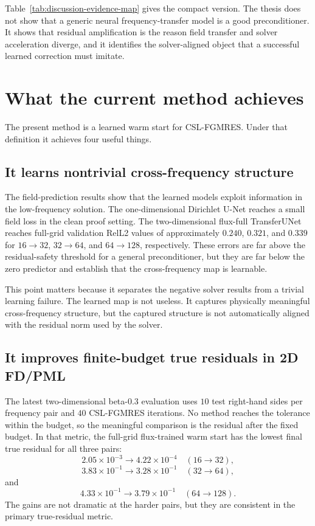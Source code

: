 Table~\ref{tab:discussion-evidence-map} gives the compact version. The thesis
does not show that a generic neural frequency-transfer model is a good
preconditioner. It shows that residual amplification is the reason field
transfer and solver acceleration diverge, and it identifies the solver-aligned
object that a successful learned correction must imitate.

\section{What the current method achieves}
\label{sec:discussion-what-works}

The present method is a learned warm start for CSL-FGMRES. Under that
definition it achieves four useful things.

\subsection{It learns nontrivial cross-frequency structure}
\label{subsec:discussion-cross-frequency}

The field-prediction results show that the learned models exploit information
in the low-frequency solution. The one-dimensional Dirichlet U-Net reaches a
small field loss in the clean proof setting. The two-dimensional flux-full
TransferUNet reaches full-grid validation RelL2 values of approximately
$0.240$, $0.321$, and $0.339$ for $16\to32$, $32\to64$, and $64\to128$,
respectively. These errors are far above the residual-safety threshold for a
general preconditioner, but they are far below the zero predictor and establish
that the cross-frequency map is learnable.

This point matters because it separates the negative solver results from a
trivial learning failure. The learned map is not useless. It captures
physically meaningful cross-frequency structure, but the captured structure is
not automatically aligned with the residual norm used by the solver.

\subsection{It improves finite-budget true residuals in 2D FD/PML}
\label{subsec:discussion-2d-success}

The latest two-dimensional beta-$0.3$ evaluation uses $10$ test right-hand
sides per frequency pair and $40$ CSL-FGMRES iterations. No method reaches the
tolerance within the budget, so the meaningful comparison is the residual
after the fixed budget. In that metric, the full-grid flux-trained warm start
has the lowest final true residual for all three pairs:
\[
    2.05\times10^{-3} \to 4.22\times10^{-4}
    \quad (16\to32),
\]
\[
    3.83\times10^{-1} \to 3.28\times10^{-1}
    \quad (32\to64),
\]
and
\[
    4.33\times10^{-1} \to 3.79\times10^{-1}
    \quad (64\to128).
\]
The gains are not dramatic at the harder pairs, but they are consistent in the
primary true-residual metric.

